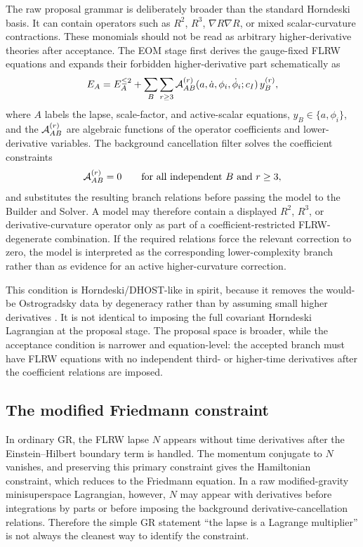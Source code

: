 \documentclass[aps,prd,twocolumn,superscriptaddress,nofootinbib,longbibliography]{revtex4-2}
\begin{document}
The raw proposal grammar is deliberately broader than the standard Horndeski basis.  It can contain operators such as $R^2$, $R^3$, $\nabla R\nabla R$, or mixed scalar-curvature contractions.  These monomials should not be read as arbitrary higher-derivative theories after acceptance.  The EOM stage first derives the gauge-fixed FLRW equations and expands their forbidden higher-derivative part schematically as
\begin{equation}
E_A=E_A^{\leq 2}+
\sum_{B}\sum_{r\geq 3}{\cal A}_{AB}^{(r)}(a,\dot a,\phi_i,\dot\phi_i;c_I)
\,y_B^{(r)},
\label{eq:forbidden-derivatives}
\end{equation}
where $A$ labels the lapse, scale-factor, and active-scalar equations, $y_B\in\{a,\phi_i\}$, and the ${\cal A}_{AB}^{(r)}$ are algebraic functions of the operator coefficients and lower-derivative variables.  The background cancellation filter solves the coefficient constraints
\begin{equation}
{\cal A}_{AB}^{(r)}=0
\qquad
\hbox{for all independent }B\hbox{ and }r\geq 3,
\label{eq:cancellation-relations}
\end{equation}
and substitutes the resulting branch relations before passing the model to the Builder and Solver.  A model may therefore contain a displayed $R^2$, $R^3$, or derivative-curvature operator only as part of a coefficient-restricted FLRW-degenerate combination.  If the required relations force the relevant correction to zero, the model is interpreted as the corresponding lower-complexity branch rather than as evidence for an active higher-curvature correction.

This condition is Horndeski/DHOST-like in spirit, because it removes the would-be Ostrogradsky data by degeneracy rather than by assuming small higher derivatives \cite{Horndeski1974,Langlois2016DHOST}.  It is not identical to imposing the full covariant Horndeski Lagrangian at the proposal stage.  The proposal space is broader, while the acceptance condition is narrower and equation-level: the accepted branch must have FLRW equations with no independent third- or higher-time derivatives after the coefficient relations are imposed.

\subsection{The modified Friedmann constraint}
\label{sec:hamiltonian}
\label{subsec:modified-friedmann}



In ordinary GR, the FLRW lapse $N$ appears without time derivatives after the Einstein--Hilbert boundary term is handled.  The momentum conjugate to $N$ vanishes, and preserving this primary constraint gives the Hamiltonian constraint, which reduces to the Friedmann equation.  In a raw modified-gravity minisuperspace Lagrangian, however, $N$ may appear with derivatives before integrations by parts or before imposing the background derivative-cancellation relations.  Therefore the simple GR statement ``the lapse is a Lagrange multiplier'' is not always the cleanest way to identify the constraint.
\end{document}
